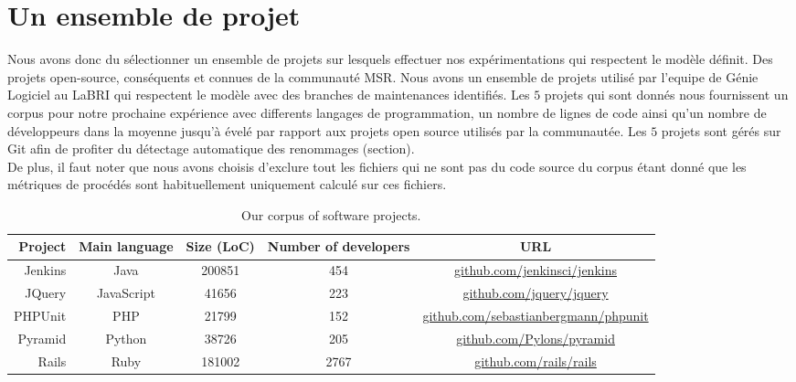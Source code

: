 \section{Un ensemble de projet}
\label{sec:ensemble_projet}
Nous avons donc du sélectionner un ensemble de projets sur lesquels effectuer nos expérimentations qui respectent le modèle définit. Des projets open-source, conséquents et connues de la communauté MSR. Nous avons un ensemble de projets utilisé par l'equipe de Génie Logiciel au LaBRI qui respectent le modèle avec des branches de maintenances identifiés. Les $5$ projets qui sont donnés  nous fournissent un corpus pour notre prochaine expérience avec differents langages de programmation, un nombre de lignes de code ainsi qu'un nombre de développeurs dans la moyenne jusqu'à évelé par rapport aux projets open source utilisés par la communautée. Les $5$ projets sont gérés sur Git afin de profiter du détectage automatique des renommages (section). \\
De plus, il faut noter que nous avons choisis d'exclure tout les fichiers qui ne sont pas du code source du corpus étant donné que les métriques de procédés sont habituellement uniquement calculé sur ces fichiers.  \\

\begin{table*}[t]
\centering
\begin{tabular}{rcccc}
\toprule
Project & Main language & Size (LoC) & Number of developers & URL\\
\midrule
Jenkins & Java & 200851 & 454 & \url{github.com/jenkinsci/jenkins} \\
JQuery & JavaScript & 41656 & 223 & \url{github.com/jquery/jquery} \\
PHPUnit & PHP & 21799 & 152 & \url{github.com/sebastianbergmann/phpunit}\\
Pyramid & Python & 38726 & 205 & \url{github.com/Pylons/pyramid} \\
Rails & Ruby & 181002 & 2767 & \url{github.com/rails/rails}\\
\bottomrule
\end{tabular}
\caption{Our corpus of software projects.}
\label{tab:projects}
\end{table*}
